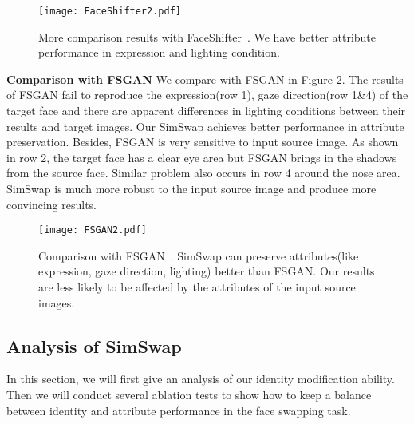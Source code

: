 \documentclass[sigconf]{acmart}
\begin{document}
\begin{figure}
\centering
\texttt{[image: FaceShifter2.pdf]}
\caption{More comparison results with FaceShifter~\cite{DBLP:FaceShifter}. We have better attribute performance in expression and lighting condition.}
\label{fig:Faceshifter}
\end{figure}

\noindent\textbf{Comparison with FSGAN} We compare with FSGAN in Figure \ref{fig:FSGAN}. The results of FSGAN fail to reproduce the expression(row 1), gaze direction(row 1\&4) of the target face and there are apparent differences in lighting conditions between their results and target images. Our SimSwap achieves better performance in attribute preservation. Besides, FSGAN is very sensitive to input source image. As shown in row 2, the target face has a clear eye area but FSGAN brings in the shadows from the source face. Similar problem also occurs in row 4 around the nose area. SimSwap is much more robust to the input source image and produce more convincing results.

\begin{figure}
\centering
\texttt{[image: FSGAN2.pdf]}
\caption{Comparison with FSGAN~\cite{DBLP:FSGAN}. SimSwap can preserve attributes(like expression, gaze direction, lighting) better than FSGAN. Our results are less likely to be affected by the attributes of the input source images.}
\label{fig:FSGAN}
\end{figure}

\subsection{Analysis of SimSwap}

In this section, we will first give an analysis of our identity modification ability. Then we will conduct several ablation tests to show how to keep a balance between identity and attribute performance in the face swapping task.
\end{document}

